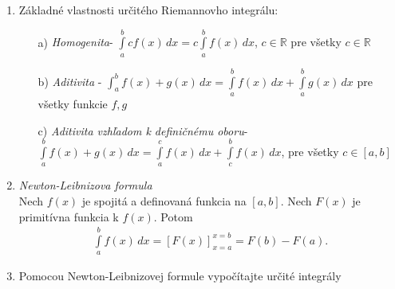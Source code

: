 \begin{enumerate}
\begin{enumerate}
{}
\end{enumerate}

\item Základné vlastnosti určitého Riemannovho integrálu:
\begin{enumerate}
\item[a)]{\textit{Homogenita}\quad -   $\int \limits_a^b cf(x) \, dx = c \int \limits_a^b f(x) \, dx$, $c \in \mathbb{R}$ pre všetky $c \in \mathbb{R}$ }
\item[b)]{\textit{Aditivita} \quad -  $\int_a^b f(x)+g(x) \, dx = \int \limits_a^b f(x) \, dx+\int \limits_a^b g(x) \,dx$ pre všetky funkcie $f,g$  }
\item[c)]{\textit{Aditivita vzhľadom k definičnému oboru}\quad -   \\$\int \limits_a^b f(x)+g(x) \, dx = \int \limits_a^c f(x) \, dx+\int \limits_c^b f(x) \,dx$, pre všetky $c \in [a,b]$}
\end{enumerate}

\item \textit{Newton-Leibnizova formula}\\
Nech $f(x)$ je spojitá a definovaná funkcia na $[a,b]$. Nech $F(x)$ je primitívna funkcia k $f(x)$. Potom
\begin{align*}
\int \limits_a^b f(x) \, dx = [F(x)]_{x=a}^{x=b}=F(b)-F(a).
\end{align*}

\item Pomocou Newton-Leibnizovej formule vypočítajte určité integrály
\begin{enumerate}


\end{enumerate}
\end{enumerate}
